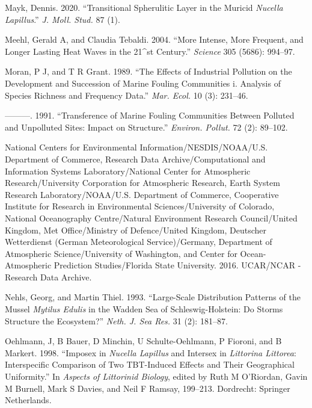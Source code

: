 \documentclass[smallextended]{svjour3}       %
\newlength{\cslhangindent}
\newenvironment{CSLReferences}[2] %
 {%
  \setlength{\parindent}{0pt}
  \ifodd #1 \everypar{\setlength{\hangindent}{\cslhangindent}}\ignorespaces\fi
  \ifnum #2 > 0
  \setlength{\parskip}{#2\baselineskip}
  \fi
 }%
 {}
\begin{document}
\begin{CSLReferences}{1}{0}
\leavevmode{}%
Mayk, Dennis. 2020. {``Transitional Spherulitic Layer in the Muricid
\emph{Nucella Lapillus}.''} \emph{J. Moll. Stud.} 87 (1).

\leavevmode{}%
Meehl, Gerald A, and Claudia Tebaldi. 2004. {``More Intense, More
Frequent, and Longer Lasting Heat Waves in the 21\^{}{st} Century.''}
\emph{Science} 305 (5686): 994--97.

\leavevmode{}%
Moran, P J, and T R Grant. 1989. {``The Effects of Industrial Pollution
on the Development and Succession of Marine Fouling Communities i.
Analysis of Species Richness and Frequency Data.''} \emph{Mar. Ecol.} 10
(3): 231--46.

\leavevmode{}%
---------. 1991. {``Transference of Marine Fouling Communities Between
Polluted and Unpolluted Sites: Impact on Structure.''} \emph{Environ.
Pollut.} 72 (2): 89--102.

\leavevmode{}%
National Centers for Environmental Information/NESDIS/NOAA/U.S.
Department of Commerce, Research Data Archive/Computational and
Information Systems Laboratory/National Center for Atmospheric
Research/University Corporation for Atmospheric Research, Earth System
Research Laboratory/NOAA/U.S. Department of Commerce, Cooperative
Institute for Research in Environmental Sciences/University of Colorado,
National Oceanography Centre/Natural Environment Research Council/United
Kingdom, Met Office/Ministry of Defence/United Kingdom, Deutscher
Wetterdienst (German Meteorological Service)/Germany, Department of
Atmospheric Science/University of Washington, and Center for
Ocean-Atmospheric Prediction Studies/Florida State University. 2016.
UCAR/NCAR - Research Data Archive.

\leavevmode{}%
Nehls, Georg, and Martin Thiel. 1993. {``Large-Scale Distribution
Patterns of the Mussel \emph{Mytilus Edulis} in the Wadden Sea of
{Schleswig-Holstein}: Do Storms Structure the Ecosystem?''} \emph{Neth.
J. Sea Res.} 31 (2): 181--87.

\leavevmode{}%
Oehlmann, J, B Bauer, D Minchin, U Schulte-Oehlmann, P Fioroni, and B
Markert. 1998. {``Imposex in \emph{Nucella Lapillus} and Intersex in
\emph{Littorina Littorea}: Interspecific Comparison of Two TBT-Induced
Effects and Their Geographical Uniformity.''} In \emph{Aspects of
Littorinid Biology}, edited by Ruth M O'Riordan, Gavin M Burnell, Mark S
Davies, and Neil F Ramsay, 199--213. Dordrecht: Springer Netherlands.


\end{CSLReferences}
\end{document}
